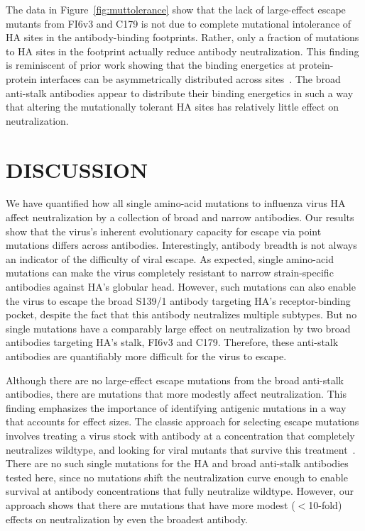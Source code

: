 \documentclass[11pt]{article}
\begin{document}
The data in Figure~\ref{fig:muttolerance} show that the lack of large-effect escape mutants from FI6v3 and C179 is not due to complete mutational intolerance of HA sites in the antibody-binding footprints.
Rather, only a fraction of mutations to HA sites in the footprint actually reduce antibody neutralization.
This finding is reminiscent of prior work showing that the binding energetics at protein-protein interfaces can be asymmetrically distributed across sites~\citep{jin1992high,cunningham1993comparison,dall1998mutational}.
The broad anti-stalk antibodies appear to distribute their binding energetics in such a way that altering the mutationally tolerant HA sites has relatively little effect on neutralization.

\section*{DISCUSSION}
We have quantified how all single amino-acid mutations to influenza virus HA affect neutralization by a collection of broad and narrow antibodies.
Our results show that the virus's inherent evolutionary capacity for escape via point mutations differs across antibodies. 
Interestingly, antibody breadth is not always an indicator of the difficulty of viral escape. 
As expected, single amino-acid mutations can make the virus completely resistant to narrow strain-specific antibodies against HA's globular head.
However, such mutations can also enable the virus to escape the broad S139/1 antibody targeting HA's receptor-binding pocket, despite the fact that this antibody neutralizes multiple subtypes.
But no single mutations have a comparably large effect on neutralization by two broad antibodies targeting HA's stalk, FI6v3 and C179.
Therefore, these anti-stalk antibodies are quantifiably more difficult for the virus to escape.

Although there are no large-effect escape mutations from the broad anti-stalk antibodies, there are mutations that more modestly affect neutralization.
This finding emphasizes the importance of identifying antigenic mutations in a way that accounts for effect sizes.
The classic approach for selecting escape mutations involves treating a virus stock with antibody at a concentration that completely neutralizes wildtype, and looking for viral mutants that survive this treatment~\citep{yewdell1979antigenic,webster1980determination}.
There are no such single mutations for the HA and broad anti-stalk antibodies tested here, since no mutations shift the neutralization curve enough to enable survival at antibody concentrations that fully neutralize wildtype.
However, our approach shows that there are mutations that have more modest ($<$10-fold) effects on neutralization by even the broadest antibody. 
\end{document}
